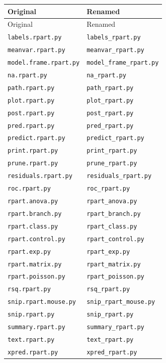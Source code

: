 \documentclass[12pt]{article}
\begin{document}
\medskip
\begin{center}
\begin{longtable}{ll}
\toprule
Original & Renamed \\
\midrule
\endfirsthead
\toprule
Original & Renamed \\
\midrule
\endhead
\texttt{labels.rpart.py} & \texttt{labels\_rpart.py} \\
\texttt{meanvar.rpart.py} & \texttt{meanvar\_rpart.py} \\
\texttt{model.frame.rpart.py} & \texttt{model\_frame\_rpart.py} \\
\texttt{na.rpart.py} & \texttt{na\_rpart.py} \\
\texttt{path.rpart.py} & \texttt{path\_rpart.py} \\
\texttt{plot.rpart.py} & \texttt{plot\_rpart.py} \\
\texttt{post.rpart.py} & \texttt{post\_rpart.py} \\
\texttt{pred.rpart.py} & \texttt{pred\_rpart.py} \\
\texttt{predict.rpart.py} & \texttt{predict\_rpart.py} \\
\texttt{print.rpart.py} & \texttt{print\_rpart.py} \\
\texttt{prune.rpart.py} & \texttt{prune\_rpart.py} \\
\texttt{residuals.rpart.py} & \texttt{residuals\_rpart.py} \\
\texttt{roc.rpart.py} & \texttt{roc\_rpart.py} \\
\texttt{rpart.anova.py} & \texttt{rpart\_anova.py} \\
\texttt{rpart.branch.py} & \texttt{rpart\_branch.py} \\
\texttt{rpart.class.py} & \texttt{rpart\_class.py} \\
\texttt{rpart.control.py} & \texttt{rpart\_control.py} \\
\texttt{rpart.exp.py} & \texttt{rpart\_exp.py} \\
\texttt{rpart.matrix.py} & \texttt{rpart\_matrix.py} \\
\texttt{rpart.poisson.py} & \texttt{rpart\_poisson.py} \\
\texttt{rsq.rpart.py} & \texttt{rsq\_rpart.py} \\
\texttt{snip.rpart.mouse.py} & \texttt{snip\_rpart\_mouse.py} \\
\texttt{snip.rpart.py} & \texttt{snip\_rpart.py} \\
\texttt{summary.rpart.py} & \texttt{summary\_rpart.py} \\
\texttt{text.rpart.py} & \texttt{text\_rpart.py} \\
\texttt{xpred.rpart.py} & \texttt{xpred\_rpart.py} \\
\bottomrule
\end{longtable}
\end{center}
\medskip
\end{document}
